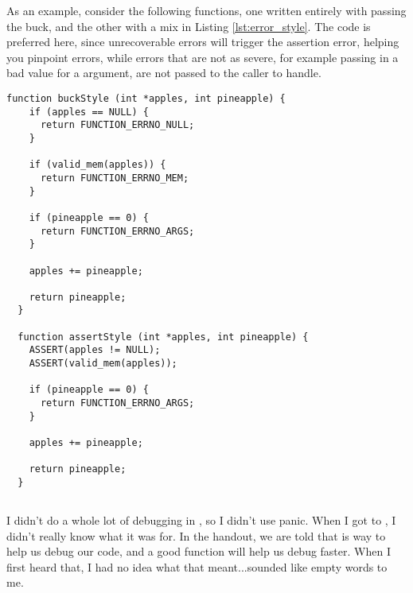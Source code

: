 \documentclass{article}
\begin{document}
As an example, consider the following functions, one written entirely with passing the buck,
and the other with a mix in Listing \ref{lst:error_style}.
The  code is preferred here, since unrecoverable errors will
trigger the assertion error, helping you pinpoint errors, while errors that are
not as severe, for example passing in a bad value for a argument, are not passed
to the caller to handle. 

\begin{lstlisting}[label={lst:error_style}, caption={Comparing passing the buck and assertion styles}]
  function buckStyle (int *apples, int pineapple) {
    if (apples == NULL) {
      return FUNCTION_ERRNO_NULL;
    }

    if (valid_mem(apples)) {
      return FUNCTION_ERRNO_MEM;
    }

    if (pineapple == 0) {
      return FUNCTION_ERRNO_ARGS;
    }

    apples += pineapple;

    return pineapple;
  }

  function assertStyle (int *apples, int pineapple) {
    ASSERT(apples != NULL);
    ASSERT(valid_mem(apples));

    if (pineapple == 0) {
      return FUNCTION_ERRNO_ARGS;
    }

    apples += pineapple;

    return pineapple;
  }
\end{lstlisting}

\subsection{}
I didn't do a whole lot of debugging in , so I didn't use panic.
When I got to , I didn't really know what it was for.
In the handout, we are told that  is way to help us debug our code,
and a good  function will help us debug faster. When I first heard that,
I had no idea what that meant...sounded like empty words to me.
\end{document}
